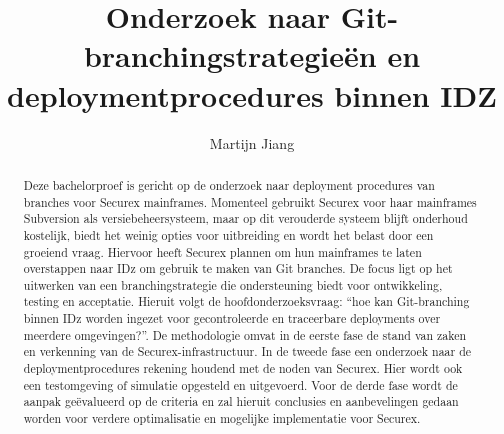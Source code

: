 \documentclass{hogent-article}
\title{Onderzoek naar Git-branchingstrategieën en deploymentprocedures binnen IDZ}
\author{Martijn Jiang}
\begin{document}
\begin{abstract}
  
Deze bachelorproef is gericht op de onderzoek naar deployment procedures van branches voor Securex mainframes. Momenteel gebruikt Securex voor haar mainframes Subversion als versiebeheersysteem, maar op dit verouderde systeem blijft onderhoud kostelijk, biedt het weinig opties voor uitbreiding en wordt het belast door een groeiend vraag. Hiervoor heeft Securex plannen om hun mainframes te laten overstappen naar IDz om gebruik te maken van Git branches. De focus ligt op het uitwerken van een branchingstrategie die ondersteuning biedt voor ontwikkeling, testing en acceptatie. Hieruit volgt de hoofdonderzoeksvraag: ``hoe kan Git-branching binnen IDz worden ingezet voor gecontroleerde en traceerbare deployments over meerdere omgevingen?''. De methodologie omvat in de eerste fase de stand van zaken en verkenning van de Securex-infrastructuur. In de tweede fase een onderzoek naar de deploymentprocedures rekening houdend met de noden van Securex. Hier wordt ook een testomgeving of simulatie opgesteld en uitgevoerd. Voor de derde fase wordt de aanpak geëvalueerd op de criteria en zal hieruit conclusies en aanbevelingen gedaan worden voor verdere optimalisatie en mogelijke implementatie voor Securex.


  

\end{abstract}
\end{document}
